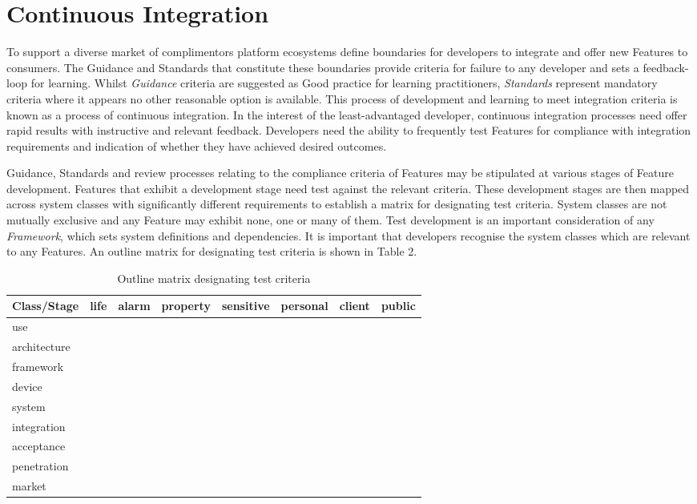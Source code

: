 \documentclass[11pt, oneside]{article}   	%
\begin{document}
\pagebreak

\section{Continuous Integration}
To support a diverse market of complimentors platform ecosystems define boundaries for developers to integrate and offer new Features to consumers.
The Guidance and Standards that constitute these boundaries provide criteria for failure to any developer and sets a feedback-loop for learning.
Whilst \emph{Guidance} criteria are suggested as Good practice for learning practitioners, \emph{Standards} represent mandatory criteria where it appears no other reasonable option is available.
This process of development and learning to meet integration criteria is known as a process of continuous integration.
In the interest of the least-advantaged developer, continuous integration processes need offer rapid results with instructive and relevant feedback.
Developers need the ability to frequently test Features for compliance with integration requirements and indication of whether they have achieved desired outcomes.\

Guidance, Standards and review processes relating to the compliance criteria of Features may be stipulated at various stages of Feature development.
Features that exhibit a development stage need test against the relevant criteria.
These development stages are then mapped across system classes with significantly different requirements to establish a matrix for designating test criteria.
System classes are not mutually exclusive and any Feature may exhibit none, one or many of them.
Test development is an important consideration of any \emph{Framework}, which sets system definitions and dependencies.
It is important that developers recognise the system classes which are relevant to any Features.
An outline matrix for designating test criteria is shown in Table 2.

\pagebreak

\FloatBarrier
\begin{table}
	\caption{Outline matrix designating test criteria}
	\begin{center}
		\begin{tabular}{| l | c | c | c | c | c | c | c |}
		\hline
		Class/Stage&life&alarm&property&sensitive&personal&client&public\\
		\hline
		use&&&&&&&\\
		architecture&&&&&&&\\
		framework&&&&&&&\\
		device&&&&&&&\\
		system&&&&&&&\\
		integration&&&&&&&\\
		acceptance&&&&&&&\\
		penetration&&&&&&&\\
		market&&&&&&&\\
		\hline
		\end{tabular}
	\end{center}
	\label{Test matrix}
\end{table}
\FloatBarrier
\end{document}
